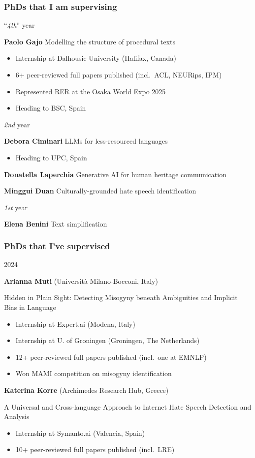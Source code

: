 \documentclass[xcolor=x11names,handout]{beamer}
\begin{document}
\begin{frame}
\frametitle{PhDs that I am supervising}

\alert{``\textit{4th}'' year}

\textbf{Paolo Gajo}
Modelling the structure of procedural texts				\pause

\begin{itemize}
 \item Internship at Dalhousie University (Halifax, Canada)
 \item 6+ peer-reviewed full papers published (incl.\, ACL, NEURips, IPM)
 \item Represented RER at the Osaka World Expo 2025
 \item Heading to BSC, Spain
\end{itemize}
\medskip	\pause

\alert{\textit{2nd} year}

\textbf{Debora Ciminari}
LLMs for less-resourced languages		\pause
\begin{itemize}
 \item Heading to UPC, Spain
\end{itemize}
\pause

\textbf{Donatella Laperchia}
Generative AI for human heritage communication
\pause

\textbf{Minggui Duan}
Culturally-grounded hate speech identification	\pause
\medskip

\alert{\textit{1st} year}

\textbf{Elena Benini}
Text simplification
\end{frame}

\begin{frame}
\frametitle{PhDs that I've supervised}

\alert{2024}

\textbf{Arianna Muti} (Universit\`a Milano-Bocconi, Italy)

Hidden in Plain Sight: Detecting Misogyny beneath Ambiguities and Implicit Bias
in Language

\begin{itemize}
 \item Internship at Expert.ai (Modena, Italy)
 \item Internship at U. of Groningen (Groningen, The Netherlands)
 \item 12+ peer-reviewed full papers published (incl.\ one at EMNLP)
 \item Won MAMI competition on misogyny identification
\end{itemize}
\medskip 					\pause


\textbf{Katerina Korre} (Archimedes Research Hub, Greece)

A Universal and Cross-language Approach to Internet Hate Speech Detection and
Analysis			\pause

\begin{itemize}
 \item Internship at Symanto.ai (Valencia, Spain)
 \item 10+ peer-reviewed full papers published (incl.\, LRE)
\end{itemize}
\end{frame}
\end{document}
